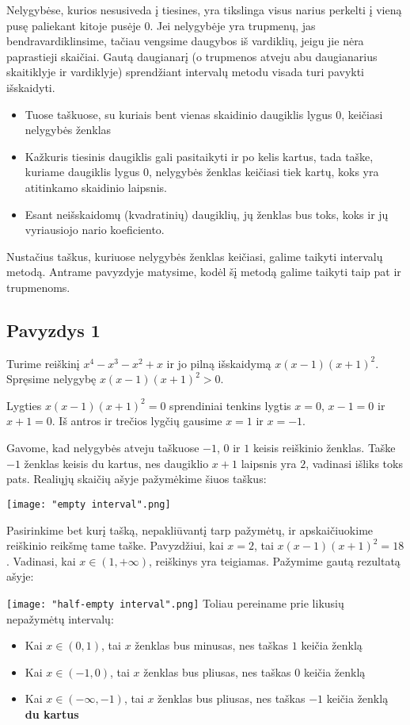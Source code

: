 \documentclass[12pt,a4paper]{report}
\numberwithin{table}{chapter}
\numberwithin{figure}{chapter}
\theoremstyle{definition}
\begin{document}
Nelygybėse, kurios nesusiveda į tiesines, yra tikslinga visus narius perkelti į vieną pusę paliekant kitoje pusėje $0$. Jei nelygybėje yra trupmenų, jas bendravardiklinsime, tačiau vengsime daugybos iš vardiklių, jeigu jie nėra paprastieji skaičiai. Gautą daugianarį (o trupmenos atveju abu daugianarius skaitiklyje ir vardiklyje) sprendžiant intervalų metodu visada turi pavykti išskaidyti.

\begin{itemize}
\item Tuose taškuose, su kuriais bent vienas skaidinio daugiklis lygus $0$, keičiasi nelygybės ženklas
\item Kažkuris tiesinis daugiklis gali pasitaikyti ir po kelis kartus, tada taške, kuriame daugiklis lygus $0$, nelygybės ženklas keičiasi tiek kartų, koks yra atitinkamo skaidinio laipsnis. 
\item Esant neišskaidomų (kvadratinių) daugiklių, jų ženklas bus toks, koks ir jų vyriausiojo nario koeficiento.
\end{itemize}

Nustačius taškus, kuriuose nelygybės ženklas keičiasi,  galime taikyti intervalų metodą. Antrame pavyzdyje matysime, kodėl šį metodą galime taikyti taip pat ir trupmenoms.

\subsection* {Pavyzdys 1}
Turime reiškinį $x^4-x^3-x^2+x$ ir jo pilną išskaidymą $x(x-1)(x+1)^2$. Spręsime nelygybę  $x(x-1)(x+1)^2 >0$.

Lygties $x(x-1)(x+1)^2 = 0$ sprendiniai tenkins lygtis $x=0$, $x-1=0$ ir $x+1=0$. Iš antros ir trečios lygčių gausime $x=1$ ir $x=-1$.

Gavome, kad nelygybės atveju taškuose $-1$, $0$ ir $1$ keisis reiškinio ženklas. Taške $-1$ ženklas keisis du kartus, nes daugiklio $x+1$ laipsnis yra $2$, vadinasi išliks toks pats. Realiųjų skaičių ašyje pažymėkime šiuos taškus:

\texttt{[image: "empty interval".png]}

Pasirinkime bet kurį tašką, nepakliūvantį tarp pažymėtų, ir apskaičiuokime reiškinio reikšmę tame taške. Pavyzdžiui, kai $x=2$, tai $x(x-1)(x+1)^2=18$. Vadinasi, kai $x \in (1, +\infty)$, reiškinys yra teigiamas. Pažymime gautą rezultatą ašyje:

\texttt{[image: "half-empty interval".png]}
Toliau pereiname prie likusių nepažymėtų intervalų:
\begin{itemize}
\item Kai $x \in (0, 1)$, tai $x$ ženklas bus minusas, nes taškas $1$ keičia ženklą
\item Kai $x \in (-1, 0)$, tai $x$ ženklas bus pliusas, nes taškas $0$ keičia ženklą
\item Kai $x \in (-\infty, -1)$, tai $x$ ženklas bus pliusas, nes taškas $-1$ keičia ženklą \textbf{du kartus}
\end{itemize} 
\end{document}
